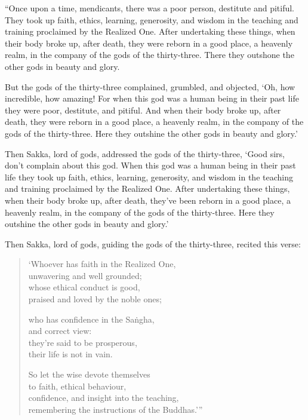 \documentclass[12pt,openany]{book}%
\begin{document}
“Once upon a time, mendicants, there was a poor person, destitute and pitiful. They took up faith, ethics, learning, generosity, and wisdom in the teaching and training proclaimed by the Realized One. After undertaking these things, when their body broke up, after death, they were reborn in a good place, a heavenly realm, in the company of the gods of the thirty-three. There they outshone the other gods in beauty and glory. 

But the gods of the thirty-three complained, grumbled, and objected, ‘Oh, how incredible, how amazing! For when this god was a human being in their past life they were poor, destitute, and pitiful. And when their body broke up, after death, they were reborn in a good place, a heavenly realm, in the company of the gods of the thirty-three. Here they outshine the other gods in beauty and glory.’ 

Then Sakka, lord of gods, addressed the gods of the thirty-three, ‘Good sirs, don’t complain about this god. When this god was a human being in their past life they took up faith, ethics, learning, generosity, and wisdom in the teaching and training proclaimed by the Realized One. After undertaking these things, when their body broke up, after death, they’ve been reborn in a good place, a heavenly realm, in the company of the gods of the thirty-three. Here they outshine the other gods in beauty and glory.’ 

Then Sakka, lord of gods, guiding the gods of the thirty-three, recited this verse: 

\begin{verse}%
‘Whoever has faith in the Realized One, \\
unwavering and well grounded; \\
whose ethical conduct is good, \\
praised and loved by the noble ones; 

who has confidence in the \textsanskrit{Saṅgha}, \\
and correct view: \\
they’re said to be prosperous, \\
their life is not in vain. 

So let the wise devote themselves \\
to faith, ethical behaviour, \\
confidence, and insight into the teaching, \\
remembering the instructions of the Buddhas.’” 

%
\end{verse}
\end{document}
